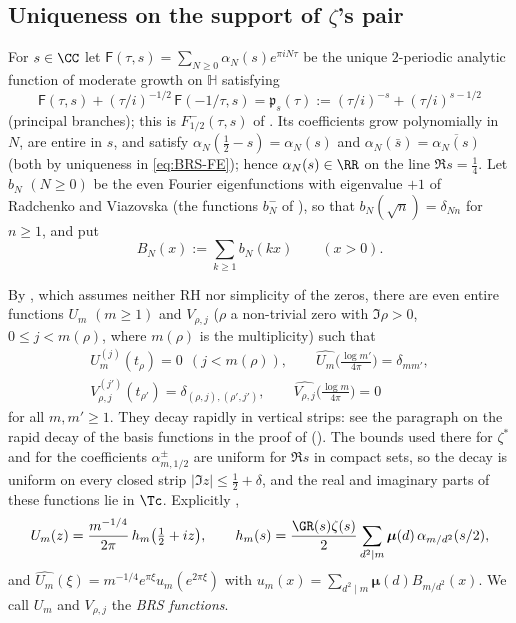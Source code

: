 \subsection{Uniqueness on the support of \texorpdfstring{$\zeta$}{zeta}'s pair}\label{ssec:support}

For $s\in\CC$ let $\mathsf F(\tau,s)=\sum_{N\ge0}\alpha_N(s)e^{\pi iN\tau}$ be the unique $2$-periodic analytic function of
moderate growth on $\mathbb H$ satisfying
\begin{equation}\label{eq:BRS-FE}
\mathsf F(\tau,s)+(\tau/i)^{-1/2}\,\mathsf F(-1/\tau,s)=\mathfrak p_s(\tau):=(\tau/i)^{-s}+(\tau/i)^{s-1/2}
\end{equation}
(principal branches); this is $F^-_{1/2}(\tau,s)$ of \cite[Theorem~3.1]{BRS}. Its coefficients grow polynomially in $N$, are entire
in $s$, and satisfy $\alpha_N(\frac12-s)=\alpha_N(s)$ and $\alpha_N(\bar s)=\overline{\alpha_N(s)}$ (both by uniqueness in
\eqref{eq:BRS-FE}); hence $\alpha_N(s)\in\RR$ on the line $\Re s=\frac14$. Let $b_N$ $(N\ge0)$ be the even Fourier
eigenfunctions with eigenvalue $+1$ of Radchenko and Viazovska \cite{RV19} (the functions $b_N^-$ of \cite[\S3.4.1]{BRS}), so that
$b_N(\sqrt n)=\delta_{Nn}$ for $n\ge1$, and put
\[
B_N(x):=\sum_{k\ge1}b_N(kx)\qquad(x>0).
\]

\begin{definition}
By \cite[Theorem~1.1]{BRS}, which assumes neither RH nor simplicity of the zeros, there are even entire functions $U_m$
$(m\ge1)$ and $V_{\rho,j}$ ($\rho$ a non-trivial zero with $\Im\rho>0$, $0\le j<m(\rho)$, where $m(\rho)$ is the multiplicity)
such that
\begin{gather*}
U_m^{(j)}(t_\rho)=0\ \ (j<m(\rho)),\qquad \widehat{U_m}\Big(\frac{\log m'}{4\pi}\Big)=\delta_{mm'},\\
V_{\rho,j}^{(j')}(t_{\rho'})=\delta_{(\rho,j),(\rho',j')},\qquad \widehat{V_{\rho,j}}\Big(\frac{\log m}{4\pi}\Big)=0
\end{gather*}
for all $m,m'\ge1$. They decay rapidly in vertical strips: see the paragraph on the rapid decay of the basis functions in the proof of
\cite[Theorem~1.1]{BRS} (\cite[\S4.3]{BRS}). The bounds used there for $\zeta^*$ and for the coefficients $\alpha^\pm_{m,1/2}$ are uniform
for $\Re s$ in compact sets, so the decay is uniform on every closed strip $\lvert\Im z\rvert\le\frac12+\delta$, and the real and imaginary
parts of these functions lie in $\Tc$. Explicitly \cite[\S\S4.2--4.3]{BRS},
\begin{equation}\label{eq:Um}
U_m(z)=\frac{m^{-1/4}}{2\pi}\,h_m\big(\tfrac12+iz\big),\qquad h_m(s)=\frac{\GR(s)\zeta(s)}2\sum_{d^2\mid m}\boldsymbol\mu(d)\,\alpha_{m/d^2}(s/2),
\end{equation}
and $\widehat{U_m}(\xi)=m^{-1/4}e^{\pi\xi}u_m(e^{2\pi\xi})$ with $u_m(x)=\sum_{d^2\mid m}\boldsymbol\mu(d)B_{m/d^2}(x)$.
We call $U_m$ and $V_{\rho,j}$ the \emph{BRS functions}.
\end{definition}

